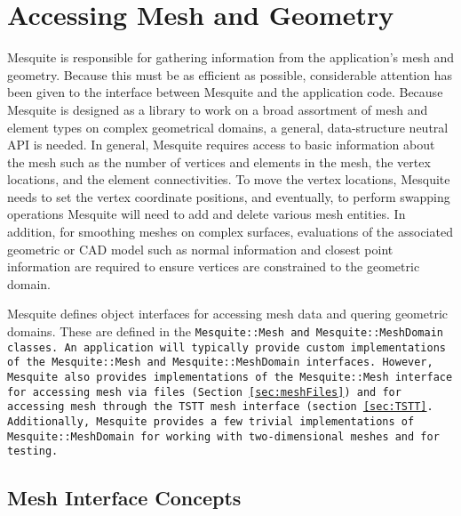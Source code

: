 \chapter{Accessing Mesh and Geometry}
\label{sec:meshes}

Mesquite is responsible for gathering information from the
application's mesh and geometry.  Because this must be as efficient as
possible, considerable attention has been given to the interface
between Mesquite and the application code.  Because Mesquite is
designed as a library to work on a broad assortment of mesh and
element types on complex geometrical domains, a general,
data-structure neutral API is needed.  In general, Mesquite requires
access to basic information about the mesh such as the number of
vertices and elements in the mesh, the vertex locations, and the
element connectivities.  To move the vertex locations, Mesquite needs
to set the vertex coordinate positions, and eventually, to perform
swapping operations Mesquite will need to add and delete various mesh
entities.  In addition, for smoothing meshes on complex surfaces,
evaluations of the associated geometric or CAD model such as normal
information and closest point information are required to ensure
vertices are constrained to the geometric domain.

Mesquite defines object interfaces for accessing mesh data and quering 
geometric domains.  These are defined in the \tt{Mesquite::Mesh} and 
\tt{Mesquite::MeshDomain} classes.  An application will typically provide custom implementations of the \tt{Mesquite::Mesh} and \tt{Mesquite::MeshDomain} interfaces.  However, Mesquite also provides 
implementations of the \tt{Mesquite::Mesh} interface for accessing 
mesh via files (Section \ref{sec:meshFiles}) and for accessing mesh
through the TSTT mesh interface (section \ref{sec:TSTT}.  Additionally, Mesquite provides a few trivial implementations of \tt{Mesquite::MeshDomain} for working with two-dimensional meshes and for testing.

\section{Mesh Interface Concepts}


